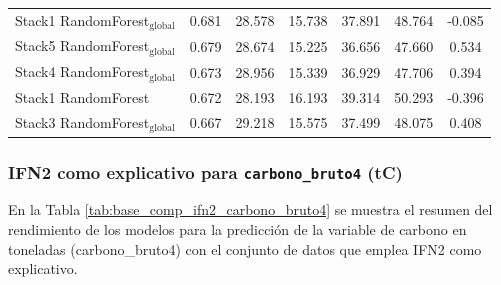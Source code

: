 \begin{table}
{\begin{tabular}{p{4.5cm}cccccc}
        Stack1 RandomForest$_{\text{global}}$ & 0.681 & 28.578 & 15.738 & 37.891 & 48.764 & -0.085 \\
        Stack5 RandomForest$_{\text{global}}$ & 0.679 & 28.674 & 15.225 & 36.656 & 47.660 & 0.534 \\
        Stack4 RandomForest$_{\text{global}}$ & 0.673 & 28.956 & 15.339 & 36.929 & 47.706 & 0.394 \\
        Stack1 RandomForest & 0.672 & 28.193 & 16.193 & 39.314 & 50.293 & -0.396 \\
        Stack3 RandomForest$_{\text{global}}$ & 0.667 & 29.218 & 15.575 & 37.499 & 48.075 & 0.408 \\
            \bottomrule
    \end{tabular}
    }
\end{table}

\subsubsection{IFN2 como explicativo para \texttt{carbono\_bruto4} (tC)}


En la Tabla \ref{tab:base_comp_ifn2_carbono_bruto4} se muestra el resumen del rendimiento de los modelos para la predicción de la variable de carbono en toneladas (carbono\_bruto4) con el conjunto de datos que emplea IFN2 como explicativo.

